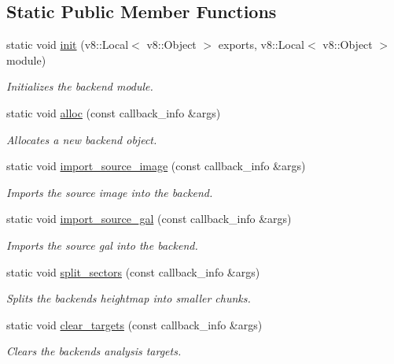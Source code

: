 \subsection*{Static Public Member Functions}
\begin{DoxyCompactItemize}
\item 
static void \hyperlink{classbackend_a44ff4b919d81243742ff4b4bedde4f83}{init} (v8\+::\+Local$<$ v8\+::\+Object $>$ exports, v8\+::\+Local$<$ v8\+::\+Object $>$ module)
\begin{DoxyCompactList}\small\item\em Initializes the backend module. \end{DoxyCompactList}\item 
static void \hyperlink{classbackend_a9e8157df648d308880c4ec62adc426fb}{alloc} (const callback\+\_\+info \&args)
\begin{DoxyCompactList}\small\item\em Allocates a new backend object. \end{DoxyCompactList}\item 
static void \hyperlink{classbackend_a516007959f2bc8b4f5f83d1a448a6090}{import\+\_\+source\+\_\+image} (const callback\+\_\+info \&args)
\begin{DoxyCompactList}\small\item\em Imports the source image into the backend. \end{DoxyCompactList}\item 
static void \hyperlink{classbackend_a63f2bdc2cb5376f087935230f6b7831d}{import\+\_\+source\+\_\+gal} (const callback\+\_\+info \&args)
\begin{DoxyCompactList}\small\item\em Imports the source gal into the backend. \end{DoxyCompactList}\item 
static void \hyperlink{classbackend_a3b212ebed9184a5818c9ce81b5513a3c}{split\+\_\+sectors} (const callback\+\_\+info \&args)
\begin{DoxyCompactList}\small\item\em Splits the backend\textquotesingle{}s heightmap into smaller chunks. \end{DoxyCompactList}\item 
static void \hyperlink{classbackend_a3831c36d689d4a5dfa696902c6cac0d1}{clear\+\_\+targets} (const callback\+\_\+info \&args)
\begin{DoxyCompactList}\small\item\em Clears the backend\textquotesingle{}s analysis targets. \end{DoxyCompactList}\item 

\end{DoxyCompactItemize}
